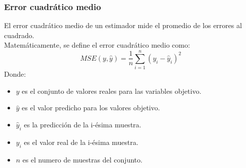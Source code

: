 \subsubsection*{Error cuadrático medio}
El error cuadrático medio de un estimador mide el promedio de los errores al cuadrado.\\
Matemáticamente, se define el error cuadrático medio como:
\[MSE(y,\hat{y}) = \frac{1}{n} \sum_{i=1}^{n} (y_i - \hat{y}_i) ^2\]
Donde:
\begin{itemize}
	\item $y$ es el conjunto de valores reales para las variables objetivo.
	\item $\hat{y}$ es el valor predicho para los valores objetivo.
	\item $\hat{y}_i$ es la predicción de la i-ésima muestra.
	\item $y_i$ es el valor real de la i-ésima muestra.
	\item $n$ es el numero de muestras del conjunto.
\end{itemize}
\pagebreak
